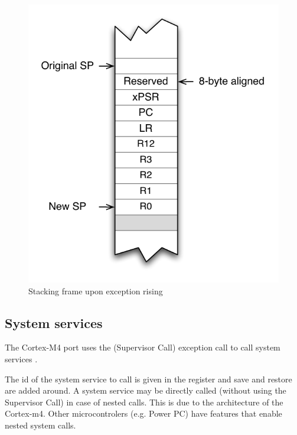 \begin{figure}[htbp] %
\begin{minipage}{0.5\textwidth}
    \centering
  \includegraphics[scale=.6]{pictures/CM4StackExceptionEntry} 
\end{minipage}
\begin{minipage}{0.5\textwidth}
   \caption{Stacking frame upon exception rising}\label{fig:CM4StackExceptionEntry}
\end{minipage}
\end{figure}

\subsection{System services} \label{sec:systemservices}

The Cortex-M4 port uses the  (Supervisor Call) exception call to call system services \cite{}.

The id of the system service to call is given in the  register and  save and restore are added around.
A system service may be directly called (without using the Supervisor Call) in case of nested calls. This is due to the architecture of the Cortex-m4. Other microcontrolers (e.g. Power PC) have features that enable nested system calls.

